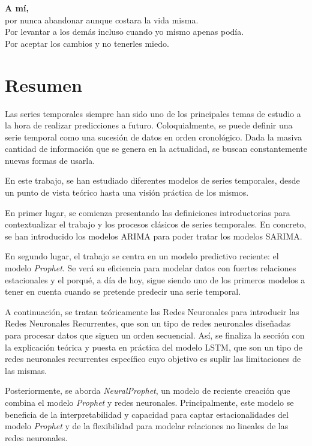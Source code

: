 \documentclass[12pt,twoside]{article}
\begin{document}
\textbf{A mí,} \\[0.5em]
por nunca abandonar aunque costara la vida misma. \\
Por levantar a los demás incluso cuando yo mismo apenas podía. \\
Por aceptar los cambios y no tenerles miedo. \\[1em]




\newpage


\section*{Resumen}

Las series temporales siempre han sido uno de los principales temas de estudio a la hora de realizar predicciones a futuro. Coloquialmente, se puede definir una serie temporal como una sucesión de datos en orden cronológico. Dada la masiva cantidad de información que se genera en la actualidad, se buscan constantemente nuevas formas de usarla.

En este trabajo, se han estudiado diferentes modelos de series temporales, desde un punto de vista teórico hasta una visión práctica de los mismos.

En primer lugar, se comienza presentando las definiciones introductorias para contextualizar el trabajo y los procesos clásicos de series temporales. En concreto, se han introducido  los modelos ARIMA para poder tratar los modelos SARIMA.

En segundo lugar, el trabajo se centra en un modelo predictivo reciente: el modelo \textit{Prophet}. Se verá su eficiencia para modelar datos con fuertes relaciones estacionales y el porqué, a día de hoy, sigue siendo uno de los primeros modelos a tener en cuenta cuando se pretende predecir una serie temporal.

A continuación, se tratan teóricamente las Redes Neuronales para introducir las Redes Neuronales Recurrentes, que son un tipo de redes neuronales diseñadas para procesar datos que siguen un orden secuencial. Así, se finaliza la sección con la explicación teórica y puesta en práctica del modelo LSTM, que son un tipo de redes neuronales recurrentes específico cuyo objetivo es suplir las limitaciones de las mismas. 

Posteriormente, se aborda \textit{NeuralProphet}, un modelo de reciente creación que combina el modelo \textit{Prophet} y redes neuronales. Principalmente, este modelo se beneficia de la interpretabilidad y capacidad para captar estacionalidades del modelo \textit{Prophet} y de la flexibilidad para modelar relaciones no lineales de las redes neuronales.
\end{document}
